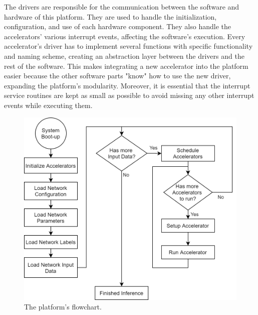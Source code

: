 The drivers are responsible for the communication between the software and hardware of this platform. They are used to handle the initialization, configuration, and use of each hardware component. They also handle the accelerators' various interrupt events, affecting the software's execution. Every accelerator's driver has to implement several functions with specific functionality and naming scheme, creating an abstraction layer between the drivers and the rest of the software. This makes integrating a new accelerator into the platform easier because the other software parts "know" how to use the new driver, expanding the platform's modularity. Moreover, it is essential that the interrupt service routines are kept as small as possible to avoid missing any other interrupt events while executing them.




\begin{figure} [H]
	\centering
	\includegraphics[width=\textwidth]{Images/Platform/PlatformFlowchart.png}
	\decoRule
	\caption[The platform's flowchart]{The platform's flowchart.}
	\label{fig:platform-flowchart}
\end{figure}

